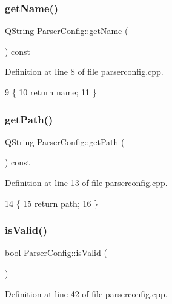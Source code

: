 \subsubsection{\texorpdfstring{get\+Name()}{getName()}}
{\footnotesize\ttfamily Q\+String Parser\+Config\+::get\+Name (\begin{DoxyParamCaption}{ }\end{DoxyParamCaption}) const}



Definition at line 8 of file parserconfig.\+cpp.


\begin{DoxyCode}
9 \{
10     \textcolor{keywordflow}{return} name;
11 \}
\end{DoxyCode}
\mbox{\label{class_parser_config_a9c35e5cd102e56c35a1030b643daed58}} 
\subsubsection{\texorpdfstring{get\+Path()}{getPath()}}
{\footnotesize\ttfamily Q\+String Parser\+Config\+::get\+Path (\begin{DoxyParamCaption}{ }\end{DoxyParamCaption}) const}



Definition at line 13 of file parserconfig.\+cpp.


\begin{DoxyCode}
14 \{
15     \textcolor{keywordflow}{return} path;
16 \}
\end{DoxyCode}
\mbox{\label{class_parser_config_a8693076fd02fe0bdad9cab47c31e83cd}} 
\subsubsection{\texorpdfstring{is\+Valid()}{isValid()}}
{\footnotesize\ttfamily bool Parser\+Config\+::is\+Valid (\begin{DoxyParamCaption}{ }\end{DoxyParamCaption})}



Definition at line 42 of file parserconfig.\+cpp.


